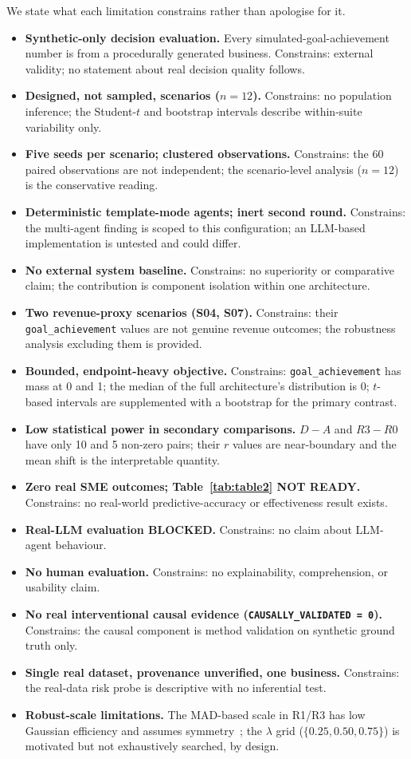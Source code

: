 \documentclass[conference]{IEEEtran}
\newcommand{\code}[1]{\texttt{#1}}
\begin{document}
We state what each limitation constrains rather than apologise for it.
\begin{itemize}
\item \textbf{Synthetic-only decision evaluation.} Every
simulated-goal-achievement number is from a procedurally generated business.
Constrains: external validity; no statement about real decision quality follows.
\item \textbf{Designed, not sampled, scenarios ($n = 12$).} Constrains: no
population inference; the Student-$t$ and bootstrap intervals describe
within-suite variability only.
\item \textbf{Five seeds per scenario; clustered observations.} Constrains: the
60 paired observations are not independent; the scenario-level analysis
($n = 12$) is the conservative reading.
\item \textbf{Deterministic template-mode agents; inert second round.}
Constrains: the multi-agent finding is scoped to this configuration; an
LLM-based implementation is untested and could differ.
\item \textbf{No external system baseline.} Constrains: no superiority or
comparative claim; the contribution is component isolation within one
architecture.
\item \textbf{Two revenue-proxy scenarios (S04, S07).} Constrains: their
\code{goal\_achievement} values are not genuine revenue outcomes; the robustness
analysis excluding them is provided.
\item \textbf{Bounded, endpoint-heavy objective.} Constrains:
\code{goal\_achievement} has mass at 0 and 1; the median of the full
architecture's distribution is 0; $t$-based intervals are supplemented with a
bootstrap for the primary contrast.
\item \textbf{Low statistical power in secondary comparisons.} $D - A$ and
$R3 - R0$ have only 10 and 5 non-zero pairs; their $r$ values are near-boundary
and the mean shift is the interpretable quantity.
\item \textbf{Zero real SME outcomes; Table~\ref{tab:table2} NOT READY.}
Constrains: no real-world predictive-accuracy or effectiveness result exists.
\item \textbf{Real-LLM evaluation BLOCKED.} Constrains: no claim about LLM-agent
behaviour.
\item \textbf{No human evaluation.} Constrains: no explainability, comprehension,
or usability claim.
\item \textbf{No real interventional causal evidence
(\code{CAUSALLY\_VALIDATED = 0}).} Constrains: the causal component is method
validation on synthetic ground truth only.
\item \textbf{Single real dataset, provenance unverified, one business.}
Constrains: the real-data risk probe is descriptive with no inferential test.
\item \textbf{Robust-scale limitations.} The MAD-based scale in R1/R3 has low
Gaussian efficiency and assumes symmetry~\cite{Rousseeuw1993}; the $\lambda$ grid
($\{0.25, 0.50, 0.75\}$) is motivated but not exhaustively searched, by design.
\end{itemize}
\end{document}
